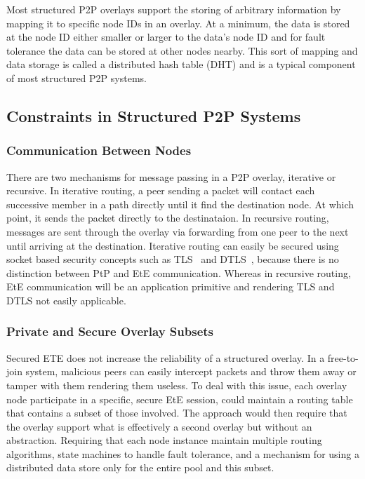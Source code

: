 \documentclass[conference]{IEEEtran}
\begin{document}
Most structured P2P overlays support the storing of arbitrary information by
mapping it to specific node IDs in an overlay.  At a minimum, the data is stored
at the node ID either smaller or larger to the data's node ID and for fault
tolerance the data can be stored at other nodes nearby.  This sort of mapping
and data storage is called a distributed hash table (DHT) and is a typical
component of most structured P2P systems.

\subsection{Constraints in Structured P2P Systems}
\subsubsection{Communication Between Nodes}
There are two mechanisms for message passing in a P2P overlay, iterative or
recursive.  In iterative routing, a peer sending a packet will contact each
successive member in a path directly until it find the destination node.  At
which point, it sends the packet directly to the destinataion.  In recursive
routing, messages are sent through the overlay via forwarding from one peer to
the next until arriving at the destination.  Iterative routing can easily be
secured using socket based security concepts such as TLS~\cite{tls} and
DTLS~\cite{dtls}, because there is no distinction between PtP
and EtE communication.  Whereas in recursive routing, EtE
communication will be an application primitive and rendering TLS and DTLS not
easily applicable.

\subsubsection{Private and Secure Overlay Subsets}
Secured ETE does not increase the reliability of a structured
overlay.  In a free-to-join system, malicious peers can easily intercept packets
and throw them away or tamper with them rendering them useless.  To deal with
this issue, each overlay node participate in a specific, secure EtE session,
could maintain a routing table that contains a subset of those involved.  The
approach would then require that the overlay support what is effectively a
second overlay but without an abstraction.  Requiring that each node instance
maintain multiple routing algorithms, state machines to handle fault tolerance,
and a mechanism for using a distributed data store only for the entire pool and
this subset.
\end{document}
